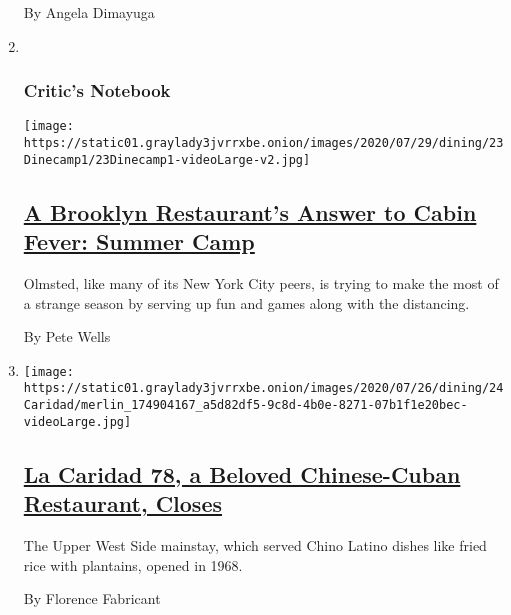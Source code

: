 \begin{enumerate}
  By Angela Dimayuga
\item ~
  \hypertarget{critics-notebook-1}{%
  \subsubsection{Critic's Notebook}\label{critics-notebook-1}}

  \texttt{[image: https://static01.graylady3jvrrxbe.onion/images/2020/07/29/dining/23Dinecamp1/23Dinecamp1-videoLarge-v2.jpg]}

  \hypertarget{a-brooklyn-restaurants-answer-to-cabin-fever-summer-camp}{%
  \subsection{\texorpdfstring{\href{/2020/07/23/dining/outdoor-dining-olmsted-summer-camp.html}{A
  Brooklyn Restaurant's Answer to Cabin Fever: Summer
  Camp}}{A Brooklyn Restaurant's Answer to Cabin Fever: Summer Camp}}\label{a-brooklyn-restaurants-answer-to-cabin-fever-summer-camp}}

  Olmsted, like many of its New York City peers, is trying to make the
  most of a strange season by serving up fun and games along with the
  distancing.

  By Pete Wells
\item
  \texttt{[image: https://static01.graylady3jvrrxbe.onion/images/2020/07/26/dining/24Caridad/merlin\_174904167\_a5d82df5-9c8d-4b0e-8271-07b1f1e20bec-videoLarge.jpg]}

  \hypertarget{la-caridad-78-a-beloved-chinese-cuban-restaurant-closes}{%
  \subsection{\texorpdfstring{\href{/2020/07/24/dining/la-caridad-78-closes.html}{La
  Caridad 78, a Beloved Chinese-Cuban Restaurant,
  Closes}}{La Caridad 78, a Beloved Chinese-Cuban Restaurant, Closes}}\label{la-caridad-78-a-beloved-chinese-cuban-restaurant-closes}}

  The Upper West Side mainstay, which served Chino Latino dishes like
  fried rice with plantains, opened in 1968.

  By Florence Fabricant
\end{enumerate}

